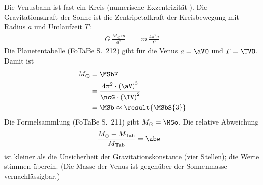 \begin{center}
\end{center}

Die Venusbahn ist fast ein Kreis (numerische Exzentrizität \exVO). Die Gravitationskraft der Sonne ist die Zentripetalkraft der Kreisbewegung mit Radius $a$ und Umlaufzeit $T$:
\begin{align}
 G\,\frac{M_\odot\, m}{a^2} &= m\,\frac{4\pi^2 a}{T^2}
\end{align}
Die Planetentabelle (FoTaBe S.~212) gibt für die Venus $a = \aVO$ und $T = \TVO$. Damit ist
\begin{align}
 M_\odot &= \MSbF \\
   &= \frac{4\pi^2\cdot\left(\aV\right)^3}{\ncG\cdot\left(\TV\right)^2} \\
   &= \MSb \approx \result{\MSbS{3}}
\end{align}
Die Formelsammlung (FoTaBe S.~211) gibt $M_\odot = \MSo$. Die relative Abweichung
\begin{align}
 \frac{M_\odot-M_\text{Tab}}{M_\text{Tab}} &= \abw
\end{align}
ist kleiner als die Unsicherheit der Gravitationskonstante (vier Stellen); die Werte stimmen überein. (Die Masse der Venus ist gegenüber der Sonnenmasse vernachlässigbar.)
